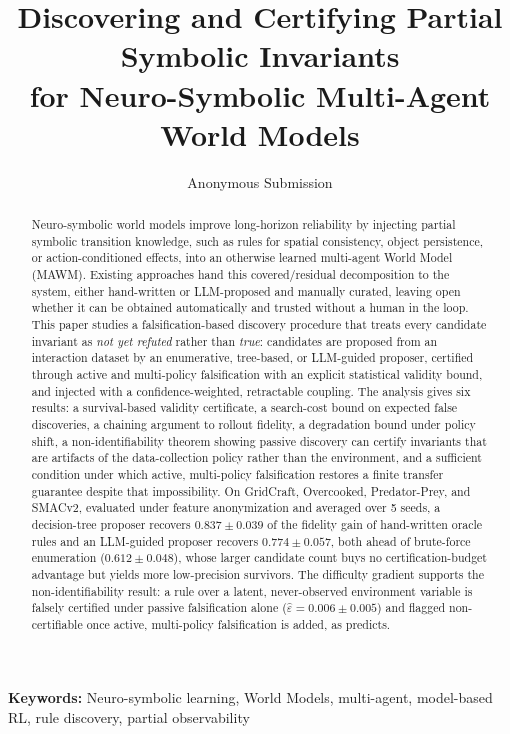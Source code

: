 \documentclass[letterpaper]{article} %
\title{Discovering and Certifying Partial Symbolic Invariants \\ for Neuro-Symbolic Multi-Agent World Models}
\author{Anonymous Submission}
\let\autoref\Cref
\theoremstyle{plain}
\theoremstyle{definition}
\theoremstyle{remark}
\begin{document}
\maketitle
\begin{abstract}
  Neuro-symbolic world models improve long-horizon reliability by injecting partial symbolic transition knowledge, such as rules for spatial consistency, object persistence, or action-conditioned effects, into an otherwise learned multi-agent World Model (MAWM). Existing approaches hand this covered/residual decomposition to the system, either hand-written or LLM-proposed and manually curated, leaving open whether it can be obtained automatically and trusted without a human in the loop. This paper studies a falsification-based discovery procedure that treats every candidate invariant as \emph{not yet refuted} rather than \emph{true}: candidates are proposed from an interaction dataset by an enumerative, tree-based, or LLM-guided proposer, certified through active and multi-policy falsification with an explicit statistical validity bound, and injected with a confidence-weighted, retractable coupling. The analysis gives six results: a survival-based validity certificate, a search-cost bound on expected false discoveries, a chaining argument to rollout fidelity, a degradation bound under policy shift, a non-identifiability theorem showing passive discovery can certify invariants that are artifacts of the data-collection policy rather than the environment, and a sufficient condition under which active, multi-policy falsification restores a finite transfer guarantee despite that impossibility. On GridCraft, Overcooked, Predator-Prey, and SMACv2, evaluated under feature anonymization and averaged over 5 seeds, a decision-tree proposer recovers $0.837\pm0.039$ of the fidelity gain of hand-written oracle rules and an LLM-guided proposer recovers $0.774\pm0.057$, both ahead of brute-force enumeration ($0.612\pm0.048$), whose larger candidate count buys no certification-budget advantage but yields more low-precision survivors. The difficulty gradient supports the non-identifiability result: a rule over a latent, never-observed environment variable is falsely certified under passive falsification alone ($\hat\varepsilon=0.006\pm0.005$) and flagged non-certifiable once active, multi-policy falsification is added, as \autoref{thm:t5} predicts.
\end{abstract}

\noindent\textbf{Keywords:} Neuro-symbolic learning, World Models, multi-agent, model-based RL, rule discovery, partial observability
\end{document}
